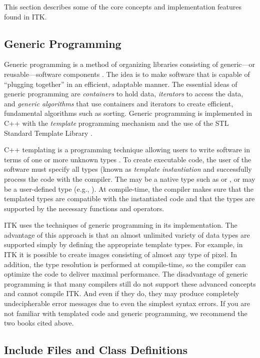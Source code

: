 This section describes some of the core concepts and implementation features
found in ITK.

\subsection{Generic Programming}
\label{sec:GenericProgramming}

Generic programming is a method of organizing libraries consisting of
generic---or reusable---software components \cite{Musser1996}. The idea is to
make software that is capable of ``plugging together'' in an efficient,
adaptable manner. The essential ideas of generic programming are
\emph{containers} to hold data, \emph{iterators} to access the data, and 
\emph{generic algorithms} that use containers and iterators to create 
efficient, fundamental algorithms such as sorting. Generic programming is
implemented in C++ with the \emph{template} programming mechanism and the 
use of the STL Standard Template Library \cite{Austern1999}.

C++ templating is a programming technique allowing users to write software in
terms of one or more unknown types . To create executable code, the
user of the software must specify all types  (known as \emph{template
instantiation} and successfully process the code with the compiler. The
 may be a native type such as
 or , or  may be a user-defined type (e.g.,
). At compile-time, the compiler makes sure that the templated 
types are compatible with the instantiated code and that the types are
supported by the necessary functions and operators.

ITK uses the techniques of generic programming in its implementation. The
advantage of this approach is that an almost unlimited variety of data types
are supported simply by defining the appropriate template types. For example,
in ITK it is possible to create images consisting of almost any type of
pixel. In addition, the type resolution is performed at compile-time, so the
compiler can optimize the code to deliver maximal performance. The
disadvantage of generic programming is that many compilers still do not
support these advanced concepts and cannot compile ITK. And even if they do,
they may produce completely undecipherable error messages due to even the
simplest syntax errors. If you are not familiar with templated code and
generic programming, we recommend the two books cited above.

\subsection{Include Files and Class Definitions}
\label{sec:IncludeFiles}

